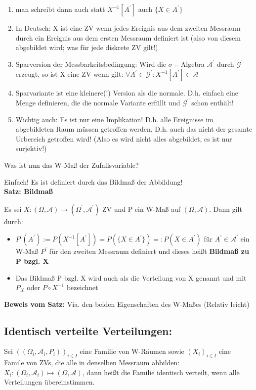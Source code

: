 \documentclass[a4paper,11pt]{scrartcl}
\begin{document}
\begin{enumerate}
    \item man schreibt dann auch statt $X^{-1}[A^{\prime}]$ auch $\{X \in A^{\prime}\}$
    \item In Deutsch: X ist eine ZV wenn jedes Ereignis aus dem zweiten Messraum durch ein Ereignis aus dem ersten Messraum definiert ist (also von diesem abgebildet wird; was für jede diskrete ZV gilt!)
    \item Sparversion der Messbarkeitsbedingung: Wird die $\sigma-$Algebra $\mathcal{A}^{\prime}$ durch $\mathcal{G}^{\prime}$ erzeugt, so ist X eine ZV wenn gilt: $\forall A^{\prime} \in \mathcal{G}^{\prime} : X^{-1}[A^{\prime}] \in \mathcal{A}$
    \item Sparvariante ist eine kleinere(!) Version als die normale.
    D.h. einfach eine Menge definieren, die die normale Variante erfüllt und $\mathcal{G^{\prime}}$ schon enthält!
    \item Wichtig auch: Es ist nur eine Implikation! D.h. alle Ereignisse im abgebildeten Raum müssen getroffen werden. D.h. auch das nicht der gesamte Urbereich getroffen wird! (Also es wird nicht alles abgebildet, es ist nur surjektiv!)
\end{enumerate}

Was ist nun das W-Maß der Zufallsvariable?

Einfach! Es ist definiert durch das Bildmaß der Abbildung!\\

\textbf{Satz: Bildmaß}

Es sei $X: (\Omega,\mathcal{A}) \rightarrow (\Omega^{\prime},\mathcal{A}^{\prime})$ ZV und P ein W-Maß auf $(\Omega,\mathcal{A})$. Dann gilt durch:
\begin{itemize}
    \item $P^{\prime}(A^{\prime}) := P(X^{-1}[A^{\prime}]) = P(\{X \in A^{\prime} \}) =: P(X \in A^{\prime})$ für $A^{\prime} \in \mathcal{A}^{\prime}$ ein W-Maß $P^{\prime}$ für den zweiten Messraum definiert und dieses heißt \textbf{Bildmaß zu P bzgl. X}
    \item Das Bildmaß P bzgl. X wird auch als die Verteilung von X genannt und mit $P_{X}$ oder $P \circ X^{-1}$ bezeichnet
\end{itemize}

\textbf{Beweis vom Satz:}
Via. den beiden Eigenschaften des W-Maßes (Relativ leicht)\\

\subsection{Identisch verteilte Verteilungen:}
Sei $((\Omega_i,\mathcal{A}_i, P_i))_{i \in I}$ eine Familie von W-Räumen sowie $(X_i)_{i \in I}$ eine Famile von ZVs, die alle in denselben Messraum abbilden: $X_i: (\Omega_i,\mathcal{A}_i) \mapsto (\Omega, \mathcal{A})$, dann heißt die Familie identisch verteilt, wenn alle Verteilungen übereinstimmen.
\end{document}
